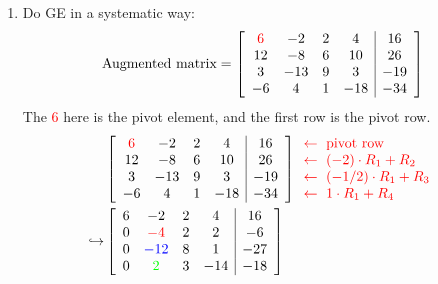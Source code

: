 \begin{example}
    \begin{enumerate}[font={\bfseries}, label={Step \arabic*.}]
        \item {
            Do GE in a systematic way:
            \[
                \text{Augmented matrix} =
                \left[\begin{array}{cccc|c}
                    \textcolor{red}{6} & -2 & 2 & 4 & 16\\
                    12 & -8 & 6 & 10 & 26\\
                    3 & -13 & 9 & 3 & -19\\
                    -6 & 4 & 1 & -18 & -34
                \end{array}\right]
            \]
            The \textcolor{red}{6} here is the pivot element, and the first row
            is the pivot row.
            \begin{align*}
                &\left[\begin{array}{cccc|c}
                    \textcolor{red}{6} & -2 & 2 & 4 & 16\\
                    12 & -8 & 6 & 10 & 26\\
                    3 & -13 & 9 & 3 & -19\\
                    -6 & 4 & 1 & -18 & -34
                \end{array}\right]
                \textcolor{red}{\begin{array}{l}
                    \leftarrow\ \text{pivot row}\\
                    \leftarrow\ (-2) \cdot R_1 + R_2 \\
                    \leftarrow\ (-1/2) \cdot R_1 + R_3 \\
                    \leftarrow\ 1 \cdot R_1 + R_4
                \end{array}}
                \\
                \hookrightarrow
                &\left[\begin{array}{cccc|c}
                    6 & -2 & 2 & 4 & 16\\
                    0 & \textcolor{red}{-4} & 2 & 2 & -6\\
                    0 & \textcolor{blue}{-12} & 8 & 1 & -27\\
                    0 & \textcolor{green}{2} & 3 & -14 & -18
                \end{array}\right]
                \textcolor{red}{\begin{array}{l}
                    \\

\end{array}}
\end{align*}}
\end{enumerate}
\end{example}
